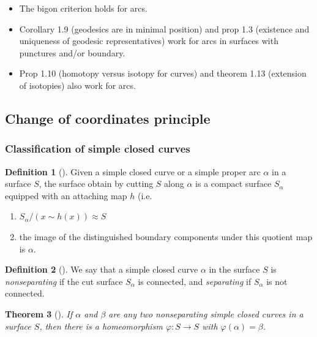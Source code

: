 \documentclass[reqno]{amsart}
\newtheorem{theorem}{Theorem}[section]
\theoremstyle{definition}
\newtheorem{definition}[theorem]{Definition}
\theoremstyle{remark}
\begin{document}
\begin{itemize}
    \item The bigon criterion holds for arcs.
    \item Corollary 1.9 (geodesics are in minimal position)
        and prop 1.3 (existence and uniqueness of geodesic 
        representatives) work for arcs in surfaces with
        punctures and/or boundary.
    \item Prop 1.10 (homotopy versus isotopy for curves) and
        theorem 1.13 (extension of isotopies) also
        work for arcs.
\end{itemize}

\subsection*{Change of coordinates principle}

\subsubsection*{Classification of simple closed curves}

\begin{definition}[]
    Given a simple closed curve or
    a simple proper arc $\alpha$ in a surface $S$,
    the surface obtain by cutting $S$ along $\alpha$ is
    a compact surface $S_{\alpha}$ equipped with an attaching
    map $h$ (i.e.
    \begin{enumerate}
        \item $S_{\alpha} / \left( x \sim h(x) \right) 
            \approx S$ 
        \item the image of the distinguished boundary components
            under this quotient map is $\alpha$.
    \end{enumerate}
\end{definition}

\begin{definition}[]
    We say that a simple closed curve $\alpha$ in the surface
    $S$ is \textit{nonseparating} if the cut surface
    $S_{\alpha}$ is connected, and \textit{separating} if
    $S_{\alpha}$ is not connected.
\end{definition}


\begin{theorem}[]
    If $\alpha$ and $\beta$ are any two nonseparating simple
    closed curves in a surface $S$, then there
    is a homeomorphism $\varphi \colon S \to S$ with
    $\varphi \left( \alpha \right) = \beta$.
\end{theorem}
\end{document}
